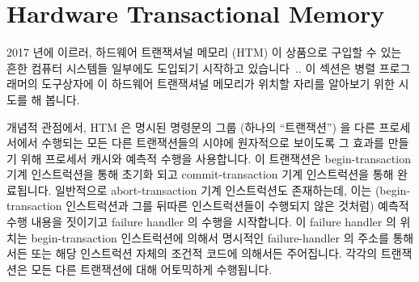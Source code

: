
\section{Hardware Transactional Memory}
\label{sec:future:Hardware Transactional Memory}

2017 년에 이르러, 하드웨어 트랜잭셔널 메모리 (HTM) 이 상품으로 구입할 수
있는 흔한 컴퓨터 시스템들 일부에도 도입되기 시작하고
있습니다~\cite{Yoo:2013:PEI:2503210.2503232,RickMerrit2011PowerTM,ChristianJacobi2012MainframeTM}..
이 섹션은 병렬 프로그래머의 도구상자에 이 하드웨어 트랜잭셔널 메모리가 위치할
자리를 알아보기 위한 시도를 해 봅니다.

개념적 관점에서, HTM 은 명시된 명령문의 그룹 (하나의 ``트랜잭션'') 을 다른
프로세서에서 수행되는 모든 다른 트랜잭션들의 시야에 원자적으로 보이도록 그
효과를 만들기 위해 프로세서 캐시와 예측적 수행을 사용합니다.
이 트랜잭션은 begin-transaction 기계 인스트럭션을 통해 초기화 되고
commit-transaction 기계 인스트럭션을 통해 완료됩니다.
일반적으로 abort-transaction 기계 인스트럭션도 존재하는데, 이는
(begin-transaction 인스트럭션과 그를 뒤따른 인스트럭션들이 수행되지 않은
것처럼) 예측적 수행 내용을 짓이기고 failure handler 의 수행을 시작합니다.
이 failure handler 의 위치는 begin-transaction 인스트럭션에 의해서 명시적인
failure-handler 의 주소를 통해서든 또는 해당 인스트럭션 자체의 조건적 코드에
의해서든 주어집니다.
각각의 트랜잭션은 모든 다른 트랜잭션에 대해 어토믹하게 수행됩니다.
\iffalse

As of 2017, hardware transactional memory (HTM) is available on several
types of commercially available commodity computer
systems~\cite{Yoo:2013:PEI:2503210.2503232,RickMerrit2011PowerTM,ChristianJacobi2012MainframeTM}.
This section makes a first attempt to find HTM's place in the parallel
programmer's toolbox.

From a conceptual viewpoint, HTM uses processor caches and speculative
execution to make a designated group of statements (a ``transaction'')
take effect atomically
from the viewpoint of any other transactions running on other processors.
This transaction is initiated by a
begin-transaction machine instruction and completed by a commit-transaction
machine instruction.
There is typically also an abort-transaction machine instruction, which
squashes the speculation (as if the begin-transaction instruction and
all following instructions had not executed) and commences execution
at a failure handler.
The location of the failure handler is typically specified by the
begin-transaction instruction, either as an explicit failure-handler
address or via a condition code set by the instruction itself.
Each transaction executes atomically with respect to all other transactions.
\fi

